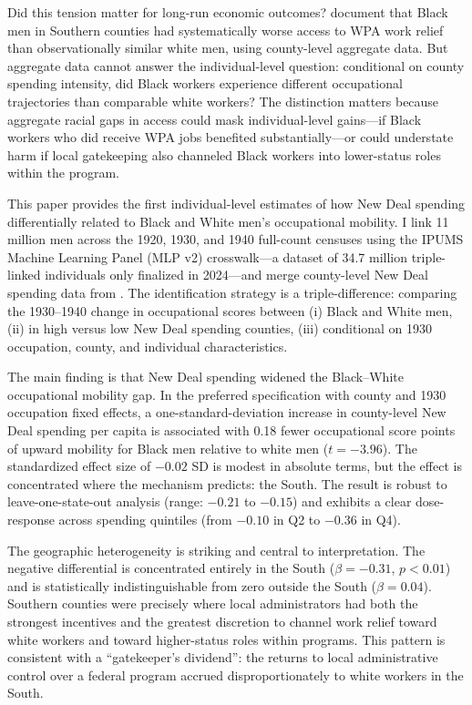 \documentclass[12pt]{article}
\begin{document}
Did this tension matter for long-run economic outcomes? \citet{taylor2024} document that Black men in Southern counties had systematically worse access to WPA work relief than observationally similar white men, using county-level aggregate data. But aggregate data cannot answer the individual-level question: conditional on county spending intensity, did Black workers experience different occupational trajectories than comparable white workers? The distinction matters because aggregate racial gaps in access could mask individual-level gains---if Black workers who did receive WPA jobs benefited substantially---or could understate harm if local gatekeeping also channeled Black workers into lower-status roles within the program.

This paper provides the first individual-level estimates of how New Deal spending differentially related to Black and White men's occupational mobility. I link 11 million men across the 1920, 1930, and 1940 full-count censuses using the IPUMS Machine Learning Panel (MLP v2) crosswalk---a dataset of 34.7 million triple-linked individuals only finalized in 2024---and merge county-level New Deal spending data from \citet{fishback2003}. The identification strategy is a triple-difference: comparing the 1930--1940 change in occupational scores between (i) Black and White men, (ii) in high versus low New Deal spending counties, (iii) conditional on 1930 occupation, county, and individual characteristics.

The main finding is that New Deal spending widened the Black--White occupational mobility gap. In the preferred specification with county and 1930 occupation fixed effects, a one-standard-deviation increase in county-level New Deal spending per capita is associated with 0.18 fewer occupational score points of upward mobility for Black men relative to white men ($t = -3.96$). The standardized effect size of $-0.02$ SD is modest in absolute terms, but the effect is concentrated where the mechanism predicts: the South. The result is robust to leave-one-state-out analysis (range: $-0.21$ to $-0.15$) and exhibits a clear dose-response across spending quintiles (from $-0.10$ in Q2 to $-0.36$ in Q4).

The geographic heterogeneity is striking and central to interpretation. The negative differential is concentrated entirely in the South ($\beta = -0.31$, $p < 0.01$) and is statistically indistinguishable from zero outside the South ($\beta = 0.04$). Southern counties were precisely where local administrators had both the strongest incentives and the greatest discretion to channel work relief toward white workers and toward higher-status roles within programs. This pattern is consistent with a ``gatekeeper's dividend'': the returns to local administrative control over a federal program accrued disproportionately to white workers in the South.
\end{document}
